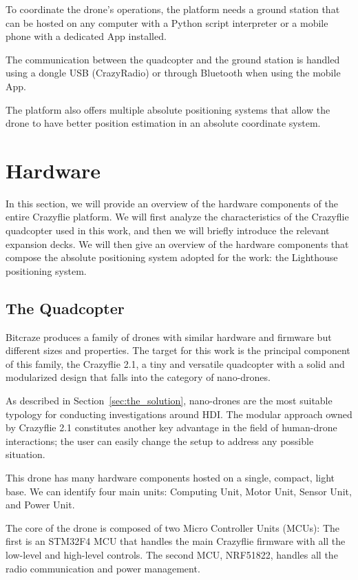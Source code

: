 To coordinate the drone's operations, the platform needs a ground station that can be hosted on any computer 
with a Python script interpreter or a mobile phone with a dedicated App installed. 

The communication between the quadcopter and the ground station is handled using a dongle USB (CrazyRadio) or through Bluetooth when using the mobile App.

The platform also offers multiple absolute positioning systems that allow the drone to have better position estimation in an absolute coordinate system.

\section{Hardware}\label{sec:crazyflie_hardware}
In this section, we will provide an overview of the hardware components of the entire Crazyflie platform. 
We will first analyze the characteristics of the Crazyflie quadcopter used in this work, and then we will briefly introduce the relevant expansion decks. 
We will then give an overview of the hardware components that compose the absolute positioning system adopted for the work: the Lighthouse positioning system.

\subsection{The Quadcopter}\label{subsec:the_quadcopter}
Bitcraze produces a family of drones with similar hardware and firmware but different sizes and properties. 
The target for this work is the principal component of this family, the Crazyflie 2.1, a tiny and versatile quadcopter with a solid and modularized design that falls into the category of nano-drones.

As described in Section~\ref{sec:the_solution}, nano-drones are the most suitable typology for conducting investigations around HDI. 
The modular approach owned by Crazyflie 2.1 constitutes another key advantage in the field of human-drone interactions; 
the user can easily change the setup to address any possible situation. 

This drone has many hardware components hosted on a single, compact, light base. 
We can identify four main units: Computing Unit, Motor Unit, Sensor Unit, and Power Unit.

The core of the drone is composed of two Micro Controller Units (MCUs): 
The first is an STM32F4 MCU that handles the main Crazyflie firmware with all the low-level and high-level controls. 
The second MCU, NRF51822, handles all the radio communication and power management. 

